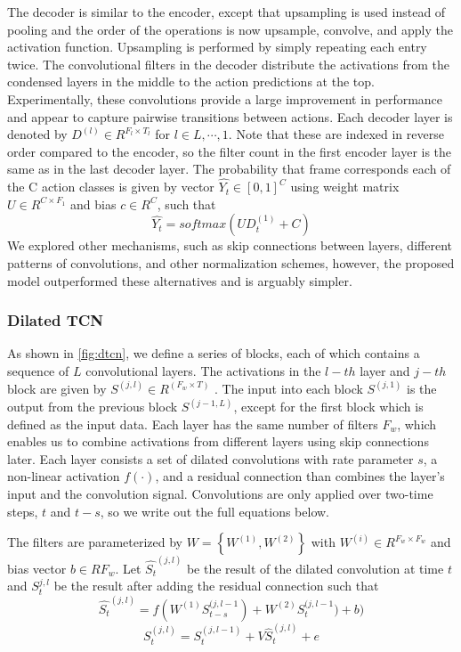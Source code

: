 The decoder is similar to the encoder, except that upsampling is used instead of pooling and the order of the operations is now upsample, convolve, and apply the activation function. Upsampling is performed by simply repeating each entry twice. The convolutional filters in the decoder distribute the activations from the condensed layers in the middle to the action predictions at the top. Experimentally, these convolutions provide a large improvement in performance and appear to capture pairwise transitions between actions. Each decoder layer is denoted by $D^{(l)} \in R^{F_l \times T_l}$ for $l \in L,\cdots,1$. Note that these are indexed in reverse order compared to the encoder, so the filter count in the first encoder layer is the same as in the last decoder layer. The probability that frame  corresponds each of the C action classes is given by vector $\hat{Y_t} \in \left[0,1\right]^C$ using weight matrix $U \in R^{C \times F_1}$ and bias $c \in R^C$, such that $$\hat{Y_t} = softmax(UD_t^{(1)}+C)$$
We explored other mechanisms, such as skip connections between layers, different patterns of convolutions, and other normalization schemes, however, the proposed model outperformed these alternatives and is arguably simpler.

\subsubsection{Dilated TCN}
As shown in \ref{fig:dtcn}, we define a series of blocks, each of which contains a sequence of $L$ convolutional layers. The activations in the $l-th$ layer and $j-th$ block are given by $S^{(j,l)} \in R^{(F_w \times T)}$ . The input into each block $S^{(j,1)}$ is the output from the previous block $S^{(j-1,L)}$, except for the first block which is defined as the input data. Each layer has the same number of filters $F_w$, which enables us to combine activations from different layers using skip connections later. Each layer consists a set of dilated convolutions with rate parameter $s$, a non-linear activation $f(\cdot)$, and a residual connection than combines the layer’s input and the convolution signal. Convolutions are only applied over two-time steps, $t$ and $t-s$, so we write out the full equations below. 

The filters are parameterized by $W = \left\{W^{(1)},W^{(2)}\right\}$ with $W^{(i)} \in R^{F_w \times F_w}$ and bias vector $b \in R{F_w}$. Let $\hat{S_t}^{(j,l)}$ be the result of the dilated convolution at time $t$ and $S_t^{j,l}$ be the result after adding the residual connection such that $$\hat{S_t}^{(j,l)} = f(W^{(1)}S_{t-s}^{(j,l-1})+W^{(2)}S_{t}^{(j,l-1})+b)$$
$$ S_t^{\left(j,l\right)}=S_t^{\left(j,l-1\right)}+V{\hat{S}}_t^{\left(j,l\right)}+e $$

